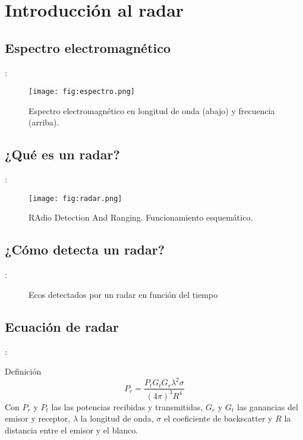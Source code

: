 \section{Introducción al radar}
\subsection{Espectro electromagnético}
\begin{frame}{\secname : \subsecname}
  \begin{figure}
    \centering
    \texttt{[image: fig:espectro.png]}
    \caption{Espectro electromagnético en longitud de onda (abajo) y frecuencia (arriba).}
    \label{}
  \end{figure}
\end{frame}

\subsection{¿Qué es un radar?}
\begin{frame}{\secname : \subsecname}
    \begin{figure}
      \centering
      \texttt{[image: fig:radar.png]}
      \caption{RAdio Detection And Ranging. Funcionamiento esquemático.}
      \label{}
    \end{figure}
\end{frame}

\subsection{¿Cómo detecta un radar?}
\begin{frame}{\secname : \subsecname}
  \begin{figure}
    \centering
    \caption{Ecos detectados por un radar en función del tiempo}
    \label{}
  \end{figure}
\end{frame}

\subsection{Ecuación de radar}
\begin{frame}{\secname : \subsecname}
    \begin{block}{Definición}
      \begin{equation}
        P_r = \frac{P_t G_t G_r \lambda^2 \sigma}{(4\pi)^3 R^4}
      \end{equation}
      Con $P_r$ y $P_t$ las las potencias recibidas y transmitidas, $G_r$ y $G_t$ las ganancias del emisor y receptor, $\lambda$ la longitud de onda, $\sigma$ el coeficiente de backscatter y $R$ la distancia entre el emisor y el blanco.
    \end{block}
\end{frame}

